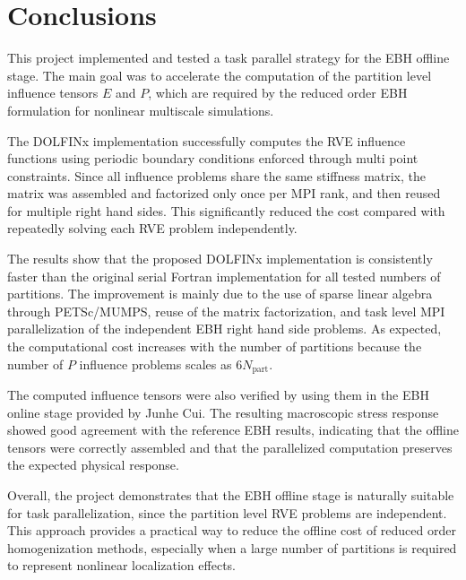\documentclass[12pt]{article}
\begin{document}
\section{Conclusions}

This project implemented and tested a task parallel strategy for the EBH offline stage. The main goal was to accelerate the computation of the partition level influence tensors $E$ and $P$, which are required by the reduced order EBH formulation for nonlinear multiscale simulations.

The DOLFINx implementation successfully computes the RVE influence functions using periodic boundary conditions enforced through multi point constraints. Since all influence problems share the same stiffness matrix, the matrix was assembled and factorized only once per MPI rank, and then reused for multiple right hand sides. This significantly reduced the cost compared with repeatedly solving each RVE problem independently.

The results show that the proposed DOLFINx implementation is consistently faster than the original serial Fortran implementation for all tested numbers of partitions. The improvement is mainly due to the use of sparse linear algebra through PETSc/MUMPS, reuse of the matrix factorization, and task level MPI parallelization of the independent EBH right hand side problems. As expected, the computational cost increases with the number of partitions because the number of $P$ influence problems scales as $6N_{\mathrm{part}}$.

The computed influence tensors were also verified by using them in the EBH online stage provided by Junhe Cui. The resulting macroscopic stress response showed good agreement with the reference EBH results, indicating that the offline tensors were correctly assembled and that the parallelized computation preserves the expected physical response.

Overall, the project demonstrates that the EBH offline stage is naturally suitable for task parallelization, since the partition level RVE problems are independent. This approach provides a practical way to reduce the offline cost of reduced order homogenization methods, especially when a large number of partitions is required to represent nonlinear localization effects.




\end{document}
